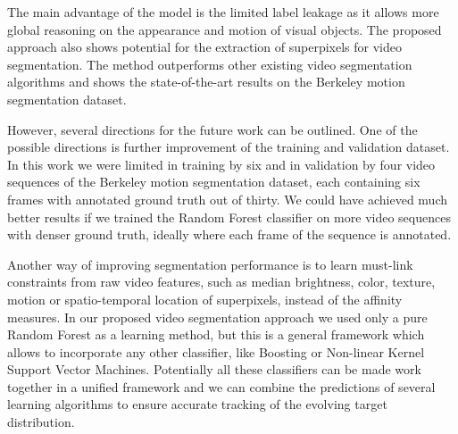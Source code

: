 The main advantage of the model is the limited label leakage as it allows more global reasoning on the appearance and motion of visual objects. 
The proposed approach also shows potential for the extraction of superpixels for video segmentation.  
The method outperforms other existing video segmentation algorithms and shows the state-of-the-art results
on the Berkeley motion segmentation dataset.

However, several directions for the future work can be outlined.
One of the possible directions is further improvement of the training and validation dataset. In this work we were limited in training by six and in validation by four video sequences of the Berkeley motion segmentation dataset, 
each containing six frames with annotated ground truth out of thirty. 
We could have achieved much better results if we trained the Random Forest classifier on more video sequences with denser ground truth, ideally where each frame of the sequence is annotated.

Another way of improving segmentation performance is to learn must-link constraints from raw video features, such as median brightness, color, texture, motion or spatio-temporal location of superpixels, instead of 
the affinity measures.   
In our proposed video segmentation approach we used only a pure Random Forest as a learning method, but this is a general framework which allows to incorporate any other classifier, 
like Boosting or Non-linear Kernel Support Vector Machines. Potentially all these classifiers can be made work together in a unified framework and we can combine the predictions of several learning algorithms
to ensure accurate tracking of the evolving target distribution.



